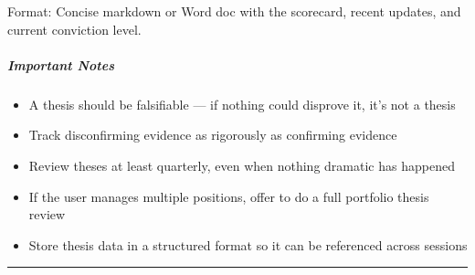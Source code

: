 \documentclass[11pt]{article}
\begin{document}
Format: Concise markdown or Word doc with the scorecard, recent updates, and current conviction level.


\subparagraph{Important Notes}\mbox{}\par

\begin{itemize}[leftmargin=*,itemsep=2pt,topsep=2pt]
\item {} A thesis should be falsifiable — if nothing could disprove it, it's not a thesis
\item {} Track disconfirming evidence as rigorously as confirming evidence
\item {} Review theses at least quarterly, even when nothing dramatic has happened
\item {} If the user manages multiple positions, offer to do a full portfolio thesis review
\item {} Store thesis data in a structured format so it can be referenced across sessions
\end{itemize}

\vspace{0.8em}\hrule\vspace{0.8em}
\end{document}
